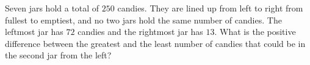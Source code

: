 Seven jars hold a total of $250$ candies. They are lined up from left to right from fullest to emptiest, and no two jars hold the same number of candies. The leftmost jar has $72$ candies and the rightmost jar has $13$. What is the positive difference between the greatest and the least number of candies that could be in the second jar from the left?
